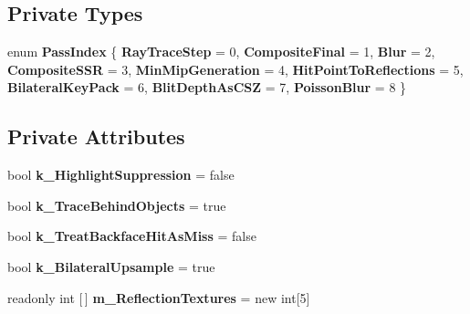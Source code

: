 \subsection*{Private Types}
\begin{DoxyCompactItemize}
\item 
\mbox{\label{class_unity_engine_1_1_post_processing_1_1_screen_space_reflection_component_a436158720e345bea4820f47196b748fe}} 
enum {\bfseries Pass\+Index} \{ \newline
{\bfseries Ray\+Trace\+Step} = 0, 
{\bfseries Composite\+Final} = 1, 
{\bfseries Blur} = 2, 
{\bfseries Composite\+S\+SR} = 3, 
\newline
{\bfseries Min\+Mip\+Generation} = 4, 
{\bfseries Hit\+Point\+To\+Reflections} = 5, 
{\bfseries Bilateral\+Key\+Pack} = 6, 
{\bfseries Blit\+Depth\+As\+C\+SZ} = 7, 
\newline
{\bfseries Poisson\+Blur} = 8
 \}
\end{DoxyCompactItemize}
\subsection*{Private Attributes}
\begin{DoxyCompactItemize}
\item 
\mbox{\label{class_unity_engine_1_1_post_processing_1_1_screen_space_reflection_component_a096d2ef9820013ddb79b0bd4d23d4b0c}} 
bool {\bfseries k\+\_\+\+Highlight\+Suppression} = false
\item 
\mbox{\label{class_unity_engine_1_1_post_processing_1_1_screen_space_reflection_component_a7fe586e0cf7002cdff8bcabd0576720a}} 
bool {\bfseries k\+\_\+\+Trace\+Behind\+Objects} = true
\item 
\mbox{\label{class_unity_engine_1_1_post_processing_1_1_screen_space_reflection_component_a405f360e417e577179cf1dde4b5402da}} 
bool {\bfseries k\+\_\+\+Treat\+Backface\+Hit\+As\+Miss} = false
\item 
\mbox{\label{class_unity_engine_1_1_post_processing_1_1_screen_space_reflection_component_a10d58abd7dfda248863c117cdd480ace}} 
bool {\bfseries k\+\_\+\+Bilateral\+Upsample} = true
\item 
\mbox{\label{class_unity_engine_1_1_post_processing_1_1_screen_space_reflection_component_a275d34901b7119d6da79847beac8fa8e}} 
readonly int \mbox{[}$\,$\mbox{]} {\bfseries m\+\_\+\+Reflection\+Textures} = new int\mbox{[}5\mbox{]}
\end{DoxyCompactItemize}



